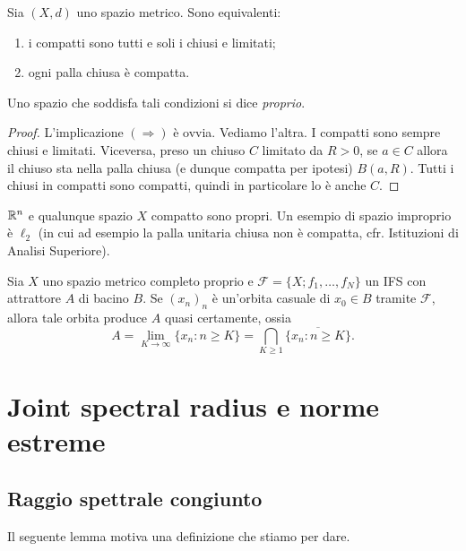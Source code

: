 \begin{lemma}
	Sia $(X,d)$ uno spazio metrico. Sono equivalenti:
	\begin{enumerate}
		\item i compatti sono tutti e soli i chiusi e limitati; 
		\item ogni palla chiusa è compatta.
	\end{enumerate}
	Uno spazio che soddisfa tali condizioni si dice \emph{proprio}.
\end{lemma}
\begin{proof}
	L'implicazione $(\Rightarrow)$ è ovvia. Vediamo l'altra.
	I compatti sono sempre chiusi e limitati. Viceversa, preso un chiuso $C$ limitato da $R>0$, se $a\in C$ allora il chiuso sta nella palla chiusa (e dunque compatta per ipotesi) $B(a,R)$. Tutti i chiusi in compatti sono compatti, quindi in particolare lo è anche $C$.
\end{proof}

\begin{esempio}
	$\mathbb{R}^{n}$ e qualunque spazio $X$ compatto sono propri. Un esempio di spazio improprio è $\ell_{2}$ (in cui ad esempio la palla unitaria chiusa non è compatta, cfr. Istituzioni di Analisi Superiore).
\end{esempio}

\begin{teorema}
	Sia $X$ uno spazio metrico completo proprio e $\mathcal F = \{X;f_{1},\dots,f_{N}\}$ un IFS con attrattore $A$ di bacino $B$. Se $(x_{n})_{n}$ è un'orbita casuale di $x_{0}\in B$ tramite $\mathcal F$, allora tale orbita produce $A$ quasi certamente, ossia $$A = \lim_{K\to\infty}\{x_{n}:n\geq K\} = \bigcap_{K\geq1}\overline{\{x_{n}:n\geq K\}}.$$
\end{teorema}






\section{Joint spectral radius e norme estreme}
\subsection{Raggio spettrale congiunto}

\begin{esempio}
\end{esempio}

Il seguente lemma motiva una definizione che stiamo per dare.

